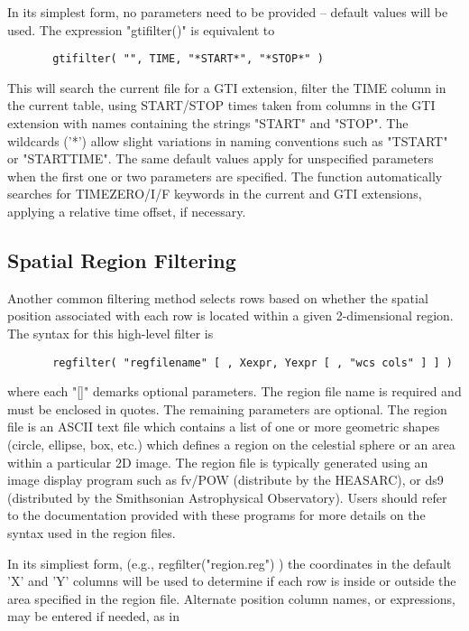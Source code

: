 \documentclass[11pt]{book}
\begin{document}
    In  its  simplest form, no parameters need to be provided -- default
    values will be used.  The expression "gtifilter()" is equivalent to

\begin{verbatim}
       gtifilter( "", TIME, "*START*", "*STOP*" )
\end{verbatim}
    This will search the current file for a GTI  extension,  filter  the
    TIME  column in the current table, using START/STOP times taken from
    columns in the GTI  extension  with  names  containing  the  strings
    "START"  and "STOP".  The wildcards ('*') allow slight variations in
    naming conventions  such  as  "TSTART"  or  "STARTTIME".   The  same
    default  values  apply for unspecified parameters when the first one
    or  two  parameters  are  specified.   The  function   automatically
    searches   for   TIMEZERO/I/F   keywords  in  the  current  and  GTI
    extensions, applying a relative time offset, if necessary.


\subsection{Spatial Region Filtering}

    Another common  filtering method selects rows based on whether the
    spatial position associated with each row is located within a given
    2-dimensional region.  The syntax for this high-level filter is

\begin{verbatim}
       regfilter( "regfilename" [ , Xexpr, Yexpr [ , "wcs cols" ] ] )
\end{verbatim}
    where each "[]" demarks optional parameters. The region file name
    is required and must be  enclosed in quotes.  The remaining
    parameters are optional.  The region file is an ASCII text file
    which contains a list of one or more geometric shapes (circle,
    ellipse, box, etc.) which defines a region on the celestial sphere
    or an area within a particular 2D image.  The region file is
    typically generated using an image display program such as fv/POW
    (distribute by the HEASARC), or ds9 (distributed by the Smithsonian
    Astrophysical Observatory).  Users should refer to the documentation
    provided with these programs for more details on the syntax used in
    the region files.

    In its simpliest form, (e.g., regfilter("region.reg") ) the
    coordinates in the default 'X' and 'Y' columns will be used to
    determine if each row is inside or outside the area specified in
    the region file.  Alternate position column names, or expressions,
    may be entered if needed, as in
\end{document}
